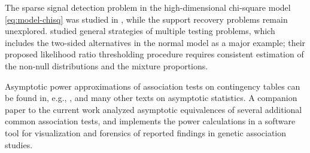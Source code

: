 The sparse signal detection problem in the high-dimensional chi-square model \eqref{eq:model-chisq} was studied in \cite{donoho2004higher},
while the support recovery problems remain unexplored.
\citet{sun2007oracle} studied general strategies of multiple testing problems, which includes the two-sided alternatives in the normal model as a major example; their proposed likelihood ratio thresholding procedure requires consistent estimation of the non-null distributions and the mixture proportions.

Asymptotic power approximations of association tests on contingency tables can be found in, e.g., \cite{ferguson2017course}, and many other texts on asymptotic statistics.
A companion paper to the current work \cite{gao2019upass} analyzed asymptotic equivalences of several additional common association tests, and implements the power calculations in a software tool for visualization and forensics of reported findings in genetic association studies.


